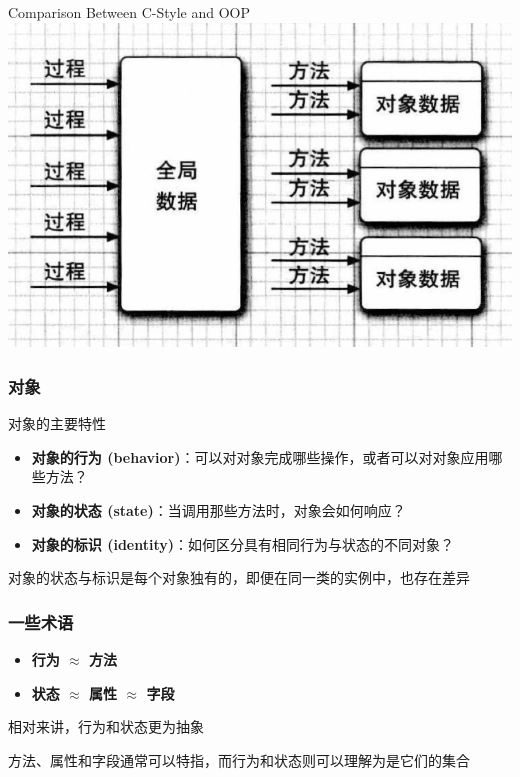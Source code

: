 \documentclass[UTF8, 16pt]{beamer}
\begin{document}
\begin{frame}
    \centering
    \textcolor{sufered}{Comparison Between C-Style and OOP}
    \includegraphics[width=0.95\linewidth]{ch2/oop.png}
\end{frame}

\begin{frame}
    \frametitle{对象}

    \textcolor{sufered}{对象的主要特性}
    \begin{itemize}
        \item \textbf{对象的行为 (behavior)}：可以对对象完成哪些操作，或者可以对对象应用哪些方法？
        \item \textbf{对象的状态 (state)}：当调用那些方法时，对象会如何响应？
        \item \textbf{对象的标识 (identity)}：如何区分具有相同行为与状态的不同对象？
    \end{itemize}

    \textcolor{sufered}{对象的状态与标识是每个对象独有的，即便在同一类的实例中，也存在差异}
\end{frame}

\begin{frame}
    \frametitle{一些术语}

    \begin{itemize}
        \item \textbf{行为 $\approx$ 方法}
        \item \textbf{状态 $\approx$ 属性 $\approx$ 字段}
    \end{itemize}
    \textcolor{sufered}{相对来讲，行为和状态更为抽象}

    方法、属性和字段通常可以特指，而行为和状态则可以理解为是它们的集合
\end{frame}
\end{document}

